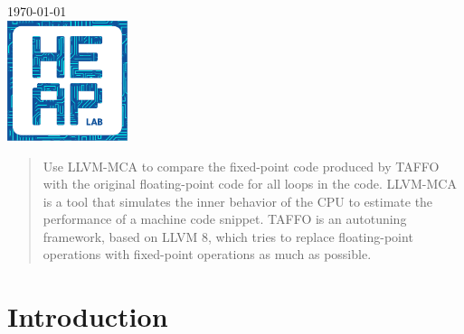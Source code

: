 \begin{titlepage}


{\large \today}\\[2cm] %


\includegraphics[width=100pt]{heaplogo.pdf}\\[1cm] %
 

\vfill %

\end{titlepage}




\begin{abstract}

Use LLVM-MCA to compare the fixed-point code produced by TAFFO with the original floating-point code for all loops in the code. 
LLVM-MCA is a tool that simulates the inner behavior of the CPU to estimate the performance of a machine code snippet.
TAFFO is an autotuning framework, based on LLVM 8, which tries to replace floating-point operations with fixed-point operations as much as possible.

\end{abstract}

\section{Introduction}

